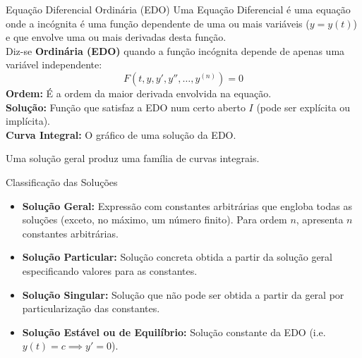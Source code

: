 \documentclass[11pt,a4paper]{article}
\begin{document}
\begin{definitionbox}{Equação Diferencial Ordinária (EDO)}
  Uma Equação Diferencial é uma equação onde a incógnita é uma função dependente de uma ou mais variáveis ($y = y(t)$) e que envolve uma ou mais derivadas desta função.  \\
  
  Diz-se \textbf{Ordinária (EDO)} quando a função incógnita depende de apenas uma variável independente:
  \[
    F\left(t, y, y', y'', \dots, y^{(n)}\right) = 0
  \]
  \textbf{Ordem:} É a ordem da maior derivada envolvida na equação.\\
  \textbf{Solução:} Função que satisfaz a EDO num certo aberto $I$ (pode ser explícita ou implícita).\\
  \textbf{Curva Integral:} O gráfico de uma solução da EDO.
  
  \vspace {0.5em}
  
  Uma solução geral produz uma família de curvas integrais.
  \begin{center}
  \end{center}
\end{definitionbox}

\begin{definitionbox}{Classificação das Soluções}
  \begin{itemize}
    \item \textbf{Solução Geral:} Expressão com constantes arbitrárias que engloba todas as soluções (exceto, no máximo, um número finito). Para ordem $n$, apresenta $n$ constantes arbitrárias.
    \vspace {0.5em}
    \item \textbf{Solução Particular:} Solução concreta obtida a partir da solução geral especificando valores para as constantes.
    \vspace {0.5em}
    \item \textbf{Solução Singular:} Solução que não pode ser obtida a partir da geral por particularização das constantes.
    \vspace {0.5em}
    \item \textbf{Solução Estável ou de Equilíbrio:} Solução constante da EDO (i.e. $y(t) = c \implies y' = 0$).
  \end{itemize}
\end{definitionbox}
\end{document}
